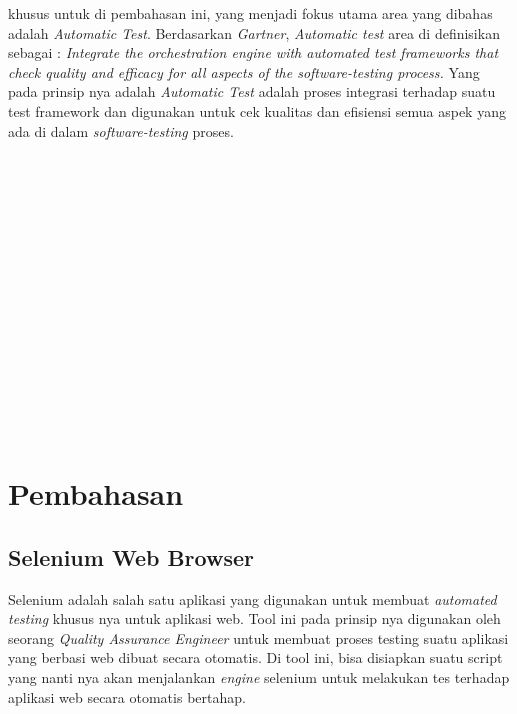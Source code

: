 \documentclass[9pt,twocolumn,twoside]{Gunadarma}
\begin{document}
khusus untuk di pembahasan ini, yang menjadi fokus utama area yang dibahas adalah \textit{Automatic Test}. Berdasarkan \textit{Gartner}, \textit{Automatic test} area di definisikan sebagai :
\textit{Integrate the orchestration engine with automated test frameworks that check quality and efficacy for all aspects of the software-testing process.} \cite{DevOps:02} 
Yang pada prinsip nya adalah \textit{Automatic Test } adalah proses integrasi terhadap suatu test framework dan digunakan untuk cek kualitas dan efisiensi semua aspek yang ada di dalam \textit{software-testing} proses. 
\\ \\ \\ \\ \\ \\ \\ \\ \\ \\ \\ \\ \\ \\ \\ \\ 

\section{Pembahasan}

\subsection{Selenium Web Browser}
Selenium adalah salah satu aplikasi yang digunakan untuk membuat \textit{automated testing} khusus nya untuk aplikasi web. Tool ini pada prinsip nya digunakan oleh seorang \textit{Quality Assurance Engineer} untuk membuat proses testing suatu aplikasi yang berbasi web dibuat secara otomatis. Di tool ini, bisa disiapkan suatu script yang nanti nya akan menjalankan \textit{engine} selenium untuk melakukan tes terhadap aplikasi web secara otomatis bertahap. 
\end{document}
